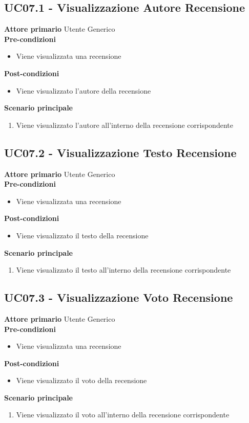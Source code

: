 \subsection{UC07.1 - Visualizzazione Autore Recensione}
\textbf{Attore primario} Utente Generico \\
\textbf{Pre-condizioni}
\begin{itemize}
    \item Viene visualizzata una recensione
\end{itemize}
\textbf{Post-condizioni}
\begin{itemize}
    \item Viene visualizzato l'autore della recensione
\end{itemize}
\textbf{Scenario principale}
\begin{enumerate}
    \item Viene visualizzato l'autore all'interno della recensione corrispondente
\end{enumerate}

\subsection{UC07.2 - Visualizzazione Testo Recensione}
\textbf{Attore primario} Utente Generico \\
\textbf{Pre-condizioni}
\begin{itemize}
    \item Viene visualizzata una recensione
\end{itemize}
\textbf{Post-condizioni}
\begin{itemize}
    \item Viene visualizzato il testo della recensione
\end{itemize}
\textbf{Scenario principale}
\begin{enumerate}
    \item Viene visualizzato il testo all'interno della recensione corrispondente
\end{enumerate}

\subsection{UC07.3 - Visualizzazione Voto Recensione}
\textbf{Attore primario} Utente Generico \\
\textbf{Pre-condizioni}
\begin{itemize}
    \item Viene visualizzata una recensione
\end{itemize}
\textbf{Post-condizioni}
\begin{itemize}
    \item Viene visualizzato il voto della recensione
\end{itemize}
\textbf{Scenario principale}
\begin{enumerate}
    \item Viene visualizzato il voto all'interno della recensione corrispondente
\end{enumerate}


